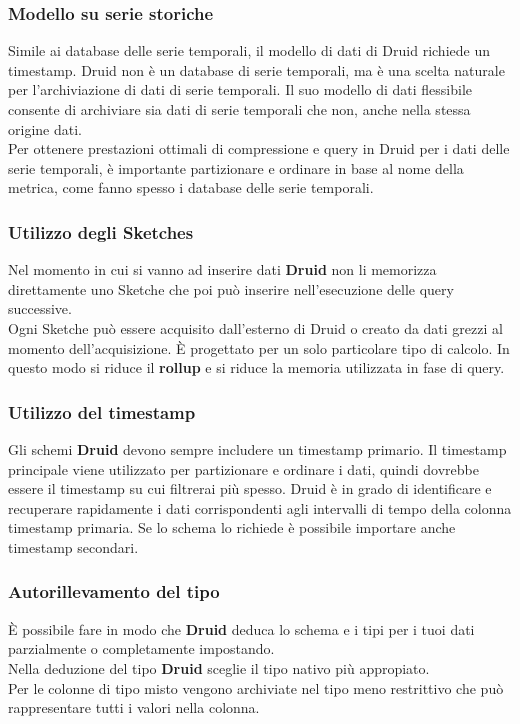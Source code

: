 \documentclass{article}
\begin{document}
\subsubsection{Modello su serie storiche}
Simile ai database delle serie temporali, il modello di dati di Druid richiede un timestamp. Druid non è un database di serie temporali, ma è una scelta naturale per l'archiviazione di dati di serie temporali. Il suo modello di dati flessibile consente di archiviare sia dati di serie temporali che non, anche nella stessa origine dati.\\
Per ottenere prestazioni ottimali di compressione e query in Druid per i dati delle serie temporali, è importante partizionare e ordinare in base al nome della metrica, come fanno spesso i database delle serie temporali.
\subsubsection{Utilizzo degli Sketches}
Nel momento in cui si vanno ad inserire dati \textbf{Druid} non li memorizza direttamente uno Sketche che poi può inserire nell'esecuzione delle query successive. \\Ogni Sketche può essere acquisito dall'esterno di Druid o creato da dati grezzi al momento dell'acquisizione. È progettato per un solo particolare tipo di calcolo. In questo modo si riduce il \textbf{rollup} e si riduce la memoria utilizzata in fase di query.
\subsubsection{Utilizzo del timestamp}
Gli schemi \textbf{Druid} devono sempre includere un timestamp primario. Il timestamp principale viene utilizzato per partizionare e ordinare i dati, quindi dovrebbe essere il timestamp su cui filtrerai più spesso. Druid è in grado di identificare e recuperare rapidamente i dati corrispondenti agli intervalli di tempo della colonna timestamp primaria.
Se lo schema lo richiede è possibile importare anche timestamp secondari.
\subsubsection{Autorillevamento del tipo}
È possibile fare in modo che \textbf{Druid} deduca lo schema e i tipi per i tuoi dati parzialmente o completamente impostando. \\
Nella deduzione del tipo \textbf{Druid} sceglie il tipo nativo più appropiato.\\
Per le colonne di tipo misto vengono archiviate nel tipo meno restrittivo che può rappresentare tutti i valori nella colonna.
\end{document}
